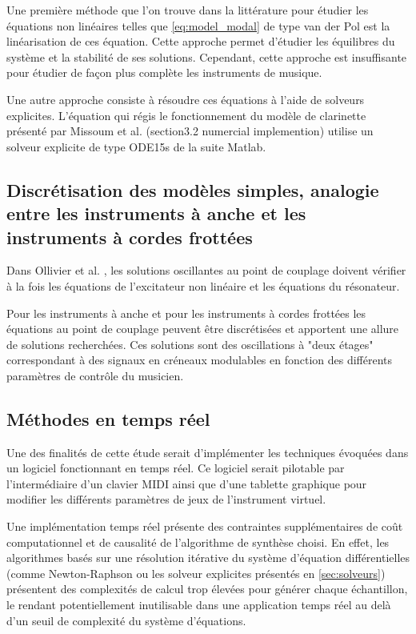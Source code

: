 \documentclass[atiam, article]{rapport} %
\begin{document}
Une première méthode que l'on trouve dans la littérature pour étudier les équations non linéaires telles que \ref{eq:model_modal} de type van der Pol est la linéarisation de ces équation. Cette approche permet d'étudier les équilibres du système et la stabilité de ses solutions. Cependant, cette approche est insuffisante pour étudier de façon plus complète les instruments de musique. 

Une autre approche consiste à résoudre ces équations à l'aide de solveurs explicites. L'équation qui régis le fonctionnement du modèle de clarinette présenté par Missoum et al. \cite{missoum_explicit_2014} (section3.2 numercial implemention) utilise un solveur explicite de type ODE15s de la suite Matlab. 

\subsection{Discrétisation des modèles simples, analogie entre les instruments à anche et les instruments à cordes frottées}

Dans Ollivier et al. \cite{ollivier_idealized_2004}, les solutions oscillantes au point de couplage doivent vérifier à la fois les équations de l'excitateur non linéaire et les équations du résonateur. 

Pour les instruments à anche et pour les instruments à cordes frottées les équations au point de couplage peuvent être discrétisées et apportent une allure de solutions recherchées. Ces solutions sont des oscillations à "deux étages" correspondant à des signaux en créneaux modulables en fonction des différents paramètres de contrôle du musicien.


\subsection{Méthodes en temps réel}

Une des finalités de cette étude serait d'implémenter les techniques évoquées dans un logiciel fonctionnant en temps réel.
Ce logiciel serait pilotable par l'intermédiaire d'un clavier MIDI ainsi que d'une tablette graphique  pour modifier les différents paramètres de jeux de l'instrument virtuel.

Une implémentation temps réel présente des contraintes supplémentaires de coût computationnel et de causalité de l'algorithme de synthèse choisi. 
En effet, les algorithmes basés sur une résolution itérative du système d'équation différentielles (comme Newton-Raphson ou les solveur explicites présentés en \ref{sec:solveurs}) présentent des complexités de calcul trop élevées pour générer chaque échantillon, le rendant potentiellement inutilisable dans une application temps réel au delà d'un seuil de complexité du système d'équations.
\end{document}
